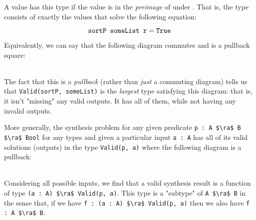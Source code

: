 \documentclass[10pt]{article}
\begin{document}
A value has this type if the value is in the \textit{preimage} of  under . That is, the type 
consists of exactly the values  that solve the following equation:

\begin{equation*}
  \texttt{sortP someList r} = \texttt{True}
\end{equation*}

%

\noindent
Equivalently, we can say that the following diagram commutes and is a pullback square:
\\

\\

\noindent
The fact that this is a \textit{pullback} (rather than \textit{just} a commuting diagram) tells us that \lstinline{Valid(sortP, someList)} is the
\textit{largest} type satisfying this diagram: that is, it isn't "missing" any valid outputs. It has all of them, while not having any invalid outputs.

More generally, the synthesis problem for any given predicate \lstinline{p : A $\ra$ B $\ra$ Bool} for any types  and  given a particular
input \lstinline{a : A} has all of its valid solutions (outputs) in the type \lstinline{Valid(p, a)} where the following diagram is a pullback:
\\

\\

\noindent
Considering all possible inputs, we find that a valid synthesis result is a function of type \lstinline{(a : A) $\ra$ Valid(p, a)}. This type is
a "subtype" of \lstinline{A $\ra$ B} in the sense that, if we have \lstinline{f : (a : A) $\ra$ Valid(p, a)} then we also have \lstinline{f : A $\ra$ B}.
\end{document}

